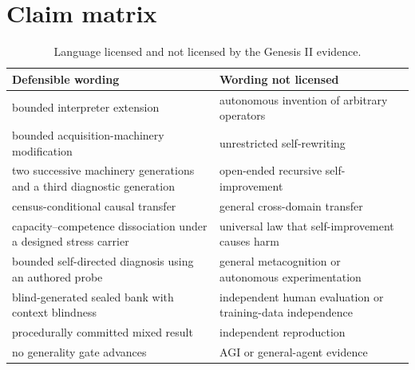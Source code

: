 \section{Claim matrix}
\label{app:claims}
\begin{table}[H]
\centering
\small
\caption{Language licensed and not licensed by the Genesis II evidence.}
\begin{tabularx}{\textwidth}{@{}X X@{}}
\toprule
Defensible wording & Wording not licensed \\
\midrule
bounded interpreter extension & autonomous invention of arbitrary operators \\
bounded acquisition-machinery modification & unrestricted self-rewriting \\
two successive machinery generations and a third diagnostic generation & open-ended recursive self-improvement \\
census-conditional causal transfer & general cross-domain transfer \\
capacity--competence dissociation under a designed stress carrier & universal law that self-improvement causes harm \\
bounded self-directed diagnosis using an authored probe & general metacognition or autonomous experimentation \\
blind-generated sealed bank with context blindness & independent human evaluation or training-data independence \\
procedurally committed mixed result & independent reproduction \\
no generality gate advances & AGI or general-agent evidence \\
\bottomrule
\end{tabularx}
\end{table}


